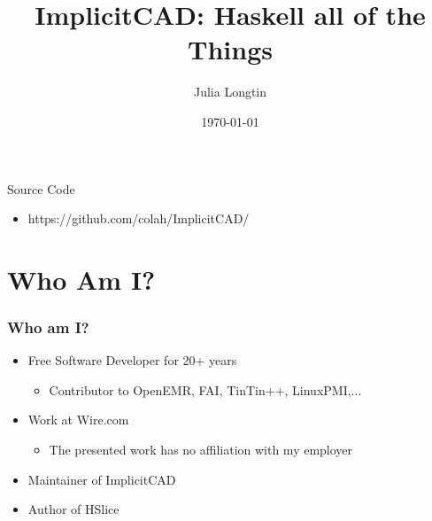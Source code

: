 \documentclass{beamer}
\title[BobKonf]{ImplicitCAD: Haskell all of the Things} %
\author{Julia Longtin} %
\institute[ImplicitCAD] %
{
ImplicitCAD Project \\ %
\medskip
\textit{julia.longtin@gmail.com} %
}
\date{\today} %
\begin{document}
\begin{frame}
\titlepage %
\begin{block}{Source Code}
\begin{itemize}
\item https://github.com/colah/ImplicitCAD/
\end{itemize}
\end{block}
\end{frame}



\section{Who Am I?} %

\begin{frame}
\frametitle{Who am I?}
\begin{itemize}
\item Free Software Developer for 20+ years
  \begin{itemize}
  \item Contributor to OpenEMR, FAI, TinTin++, LinuxPMI,...
  \end{itemize}
\item Work at Wire.com
  \begin{itemize}
  \item The presented work has no affiliation with my employer
  \end{itemize}
\item Maintainer of ImplicitCAD
\item Author of HSlice
\end{itemize}
\end{frame}
\end{document}

